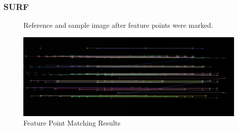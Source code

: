 		\subsubsection{SURF}
		\begin{figure}[H]
			\caption{Reference and sample image after feature points were marked.}
			\label{fig:siftFeaturePoints}
		\end{figure}
		\begin{figure}[H]
			\includegraphics[width=\linewidth]{figsrc/simulation/normal/surf_matches.png}
			\caption{Feature Point Matching Results}
			\label{fig:sifeMatchingResult}
		\end{figure}
